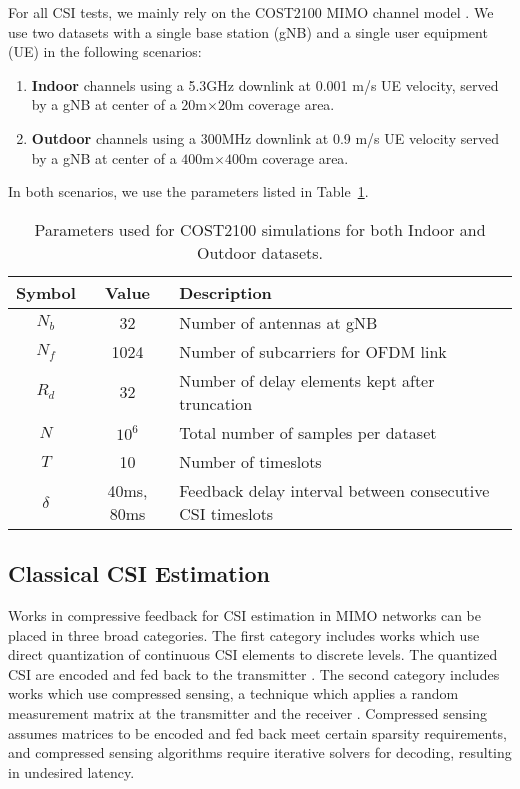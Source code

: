 For all CSI tests, we mainly rely on the COST2100 MIMO channel model \cite{ref:liu2012cost2100}. We use two datasets with a single base station (gNB) and a single user equipment (UE) in the following scenarios:
\begin{enumerate}
	\item \textbf{Indoor} channels using a 5.3GHz downlink at
	0.001 m/s UE velocity, served by a
	gNB at center of a $20$m$\times 20$m coverage area.
	\item \textbf{Outdoor} channels using a 300MHz downlink at 0.9 m/s UE velocity served by a gNB at center 
	of a $400$m$\times 400$m coverage area.
\end{enumerate}
In both scenarios, we use the parameters listed in Table~\ref{tab:cost-params}.
\begin{table}[]
\centering
\caption{Parameters used for COST2100 simulations for both Indoor and Outdoor datasets.}
\label{tab:cost-params}
\begin{tabular}{c|c|l}
\toprule
\textbf{Symbol} & \textbf{Value} & \textbf{Description} \\ \midrule
$N_b$ 			& 32			 & Number of antennas at gNB  \\ \hline
$N_f$ 			& 1024			 & Number of subcarriers for OFDM link  \\ \hline
$R_d$ 			& 32			 & Number of delay elements kept after truncation  \\ \hline
$N$ 			& $10^6$		 & Total number of samples per dataset  \\ \hline
$T$ 			& 10		 	 & Number of timeslots  \\ \hline
$\delta$		& 40ms, 80ms	 & Feedback delay interval between consecutive CSI timeslots  \\ \bottomrule
\end{tabular}
\end{table}

\subsection{Classical CSI Estimation}
\label{sect:classic_estimation}

Works in compressive feedback for CSI estimation in MIMO networks can be placed in three broad categories. The first category includes works which use direct quantization of continuous CSI elements to discrete levels. The quantized CSI are encoded and fed back to the transmitter \cite{ref:makki2012hybrid,ref:shirani2009channel}. The second category includes works which use compressed sensing, a technique which applies a random measurement matrix at the transmitter and the receiver \cite{ref:rao2014distributed, ref:eltayeb2014compressive}. Compressed sensing assumes matrices to be encoded and fed back meet certain sparsity requirements, and compressed sensing algorithms require iterative solvers \cite{ref:do2008sparsity} for decoding, resulting in undesired latency.

